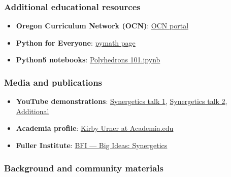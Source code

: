 \documentclass[
  10pt,
]{article}
\providecommand{\tightlist}{%
  \setlength{\itemsep}{0pt}\setlength{\parskip}{0pt}}
\begin{document}
\hypertarget{additional-educational-resources}{%
\subsubsection{Additional educational
resources}\label{additional-educational-resources}}

\begin{itemize}
\tightlist
\item
  \textbf{Oregon Curriculum Network (OCN)}:
  \href{http://www.4dsolutions.net/ocn/}{OCN portal}
\item
  \textbf{Python for Everyone}:
  \href{http://www.4dsolutions.net/ocn/pymath.html}{pymath page}
\item
  \textbf{Python5 notebooks}:
  \href{https://raw.githubusercontent.com/4dsolutions/Python5/master/Polyhedrons\%20101.ipynb}{Polyhedrons
  101.ipynb}
\end{itemize}

\hypertarget{media-and-publications}{%
\subsubsection{Media and publications}\label{media-and-publications}}

\begin{itemize}
\tightlist
\item
  \textbf{YouTube demonstrations}:
  \href{https://www.youtube.com/watch?v=g14mu4uWD4E}{Synergetics talk
  1}, \href{https://www.youtube.com/watch?v=i9oij02oje0}{Synergetics
  talk 2},
  \href{https://www.youtube.com/watch?v=D0M1h_gjA_w}{Additional}
\item
  \textbf{Academia profile}:
  \href{https://princeton.academia.edu/kirbyurner}{Kirby Urner at
  Academia.edu}
\item
  \textbf{Fuller Institute}:
  \href{https://www.bfi.org/about-fuller/big-ideas/synergetics/}{BFI ---
  Big Ideas: Synergetics}
\end{itemize}

\hypertarget{background-and-community-materials}{%
\subsubsection{Background and community
materials}\label{background-and-community-materials}}
\end{document}
